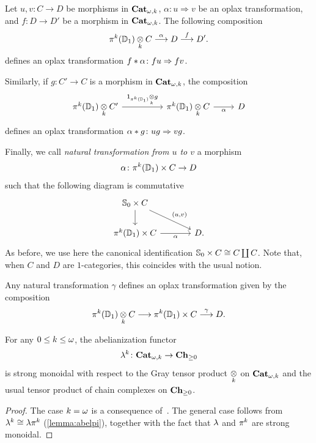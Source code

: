 \begin{paragr}
Let $u,v\colon C\to D$ be morphisms in $\mathbf{Cat}_{\omega,k}$, $\alpha\colon
u\Rightarrow v$ be an oplax transformation, and $f\colon D\to D'$ be a
morphism in $\mathbf{Cat}_{\omega,k}$.  The following composition
\[
 \mathsf{\pi}_{}^{k}(\mathbb{D}_{1}) \underset{k}{\otimes} C \overset{\alpha}{\longrightarrow} D
  \overset{f}{\longrightarrow} D'.
\]
defines an oplax transformation $f\ast\alpha\colon fu \Rightarrow fv$.

Similarly, if $g \colon C' \to C$ is a morphism in $\mathbf{Cat}_{\omega,k}$, the composition
\[
  \begin{tikzcd}
    \opifun{k}(\Dsk{1})\grayk{k} C'
    \ar[rr,"\Unit{\opifun{k}(\Dsk{1})}\grayk{k}g"]&&
    \opifun{k}(\Dsk{1})\grayk{k} C\ar[r,"\alpha"']&
    D
  \end{tikzcd}
\]
defines an oplax transformation $\alpha \ast g \colon ug \Rightarrow vg$.

Finally, we call \emph{natural transformation from $u$ to $v$} a morphism
\[
  \alpha \colon \mathsf{\pi}_{}^{k}(\mathbb{D}_{1})\times C \to D
\]
such that the following diagram is commutative
  \[
    \begin{tikzcd}[column sep=large]
      \Sph{0}\times C \ar[d] \ar[dr,"{\left(u,v\right)}"] & \\
      \opifun{k}(\Dsk{1})\times C \ar[r,"\alpha"'] & D. 
    \end{tikzcd}
  \]
  As before, we use here the canonical identification
  $\mathbb{S}_{0}\times C\cong C \coprod C$. Note that, when $C$ and $D$ are
  $1$-categories, this coincides with the usual notion.

  Any  natural
  transformation $\gamma$ defines an oplax transformation given by the composition
\[
     \mathsf{\pi}_{}^{k}(\mathbb{D}_{1})\underset{k}{\otimes}C \longrightarrow  \mathsf{\pi}_{}^{k}(\mathbb{D}_{1})\times C \overset{\gamma}{\longrightarrow} D.
  \]
\end{paragr}
\begin{proposition}\label{prop:abelmonoidal}
  For any $0 \leq k \leq \omega$, the abelianization functor
  \[
    \mathsf{\mathsf{\lambda}}^{k} \colon \mathbf{Cat}_{\omega,k} \to \mathbf{Ch}_{\geq 0}
  \]
  is strong monoidal with respect to the Gray tensor product $\underset{k}{\otimes}$ on
  $\mathbf{Cat}_{\omega,k}$ and the usual tensor product of chain complexes on $\mathbf{Ch}_{\geq 0}$.
\end{proposition}
\begin{proof}
  The case $k=\omega$ is a consequence of~\cite[Proposition A.19]{ara_maltsiniotis:joint}. The
  general case follows from  $\mathsf{\mathsf{\lambda}}^{k}\cong
  \mathsf{\lambda}\mathsf{\pi}_{}^{k}$ (\cref{lemma:abelpi}), together with the fact
  that $\mathsf{\lambda}$ and $\mathsf{\pi}_{}^{k}$ are strong monoidal.
\end{proof}
